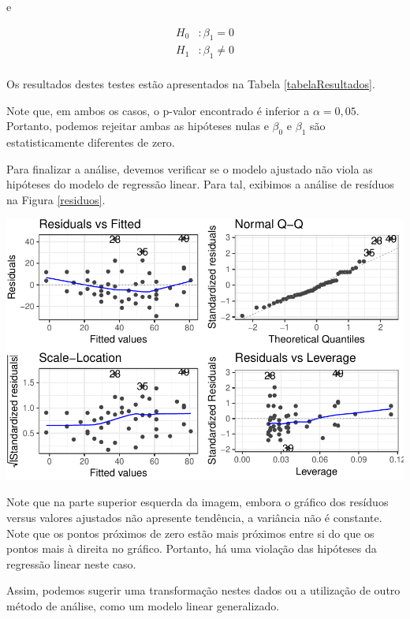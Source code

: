 \documentclass[a4paper,12pt,twoside,printwatermark=true]{modeloLEA}
\numberwithin{equation}{section}
\numberwithin{figure}{section}
\numberwithin{table}{section}
\begin{document}
\noindent e

\begin{align*}
H_0 &: \beta_1 = 0 \\
H_1 &: \beta_1 \neq 0 \\
\end{align*}

\noindent Os resultados destes testes estão apresentados na Tabela
\ref{tabelaResultados}.

Note que, em ambos os casos, o p-valor encontrado é inferior a
\(\alpha = 0,05\). Portanto, podemos rejeitar ambas as hipóteses nulas e
\(\beta_0\) e \(\beta_1\) são estatisticamente diferentes de zero.

Para finalizar a análise, devemos verificar se o modelo ajustado não
viola as hipóteses do modelo de regressão linear. Para tal, exibimos a
análise de resíduos na Figura \ref{residuos}.

\begin{Shaded}
\begin{Highlighting}[]
\end{Highlighting}
\end{Shaded}

\begin{center}\includegraphics{skeleton_files/figure-latex/residuos-1} \end{center}

Note que na parte superior esquerda da imagem, embora o gráfico dos
resíduos versus valores ajustados não apresente tendência, a variância
não é constante. Note que os pontos próximos de zero estão mais próximos
entre si do que os pontos mais à direita no gráfico. Portanto, há uma
violação das hipóteses da regressão linear neste caso.

Assim, podemos sugerir uma transformação nestes dados ou a utilização de
outro método de análise, como um modelo linear generalizado.





\end{document}
